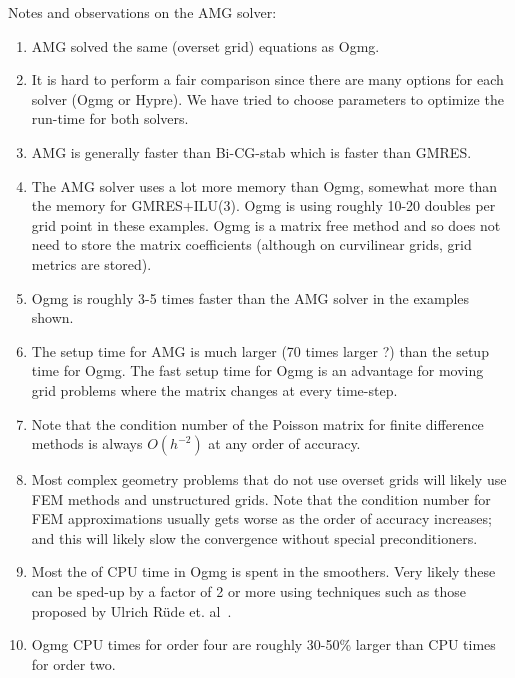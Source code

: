 \medskip
\noindent Notes and observations on the AMG solver:
\begin{enumerate}
  \item AMG solved the same (overset grid) equations as Ogmg.
  \item It is hard to perform a fair comparison since there are many options for each solver (Ogmg or Hypre).
      We have tried to choose parameters to optimize the run-time for both solvers.
  \item AMG is generally faster than Bi-CG-stab which is faster than GMRES. 
  \item The AMG solver uses a lot more memory than Ogmg, somewhat more than the memory for GMRES+ILU(3). Ogmg 
     is using roughly 10-20 doubles per grid point in these examples. Ogmg is a matrix free method and so does not
     need to store the matrix coefficients (although on curvilinear grids, grid metrics are stored).
  \item Ogmg is roughly 3-5 times faster than the AMG solver in the examples shown.
  \item The setup time for AMG is much larger (70 times larger ?) than the setup time for Ogmg. The fast setup time
    for Ogmg is an advantage for moving grid problems where the matrix changes at every time-step.
  \item Note that the condition number of the Poisson matrix for finite difference methods is always $O(h^{-2})$
         at any order of accuracy.
  \item Most complex geometry problems that do not use overset grids will likely use FEM methods and unstructured grids.
     Note that the condition number for FEM approximations usually gets worse as the order of accuracy increases; and this will likely
     slow the convergence without special preconditioners.
  \item Most the of CPU time in Ogmg is spent in the smoothers. Very likely these can be sped-up by a factor of 2 or more
     using techniques such as those proposed by Ulrich R\"ude et. al~\cite{??}.
  \item Ogmg CPU times for order four are roughly 30-50\% larger than CPU times for order two.
\end{enumerate}



